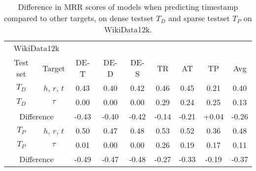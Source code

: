 \begin{table}[htb]
\centering
\begin{minipage}{\columnwidthcaption}
\centering
\caption{Difference in MRR scores of models when predicting timestamp compared to other targets, on dense testset $T_D$ and sparse testset $T_P$ on WikiData12k.}
\label{tab:time_density_timestamp_wikidata}
\end{minipage}
\vspace{-3mm}

\begin{tabular}{cc|cccccc|c} \hline
\multicolumn{2}{c|}{WikiData12k} & & & & & & \\
Test set & Target & DE-T & DE-D & DE-S & TR & AT & TP & Avg \\ \hline 
$T_D$ & $h$, $r$, $t$ & 
0.43 & 0.40 & 0.42 & 0.46 & 0.45 & 0.21 & 0.40 \\
$T_D$ & $\tau$        & 
0.00 & 0.00 & 0.00 & 0.29 & 0.24 & 0.25 & 0.13\\ \hline
\multicolumn{2}{c|}{Difference} & 
-0.43 & -0.40 & -0.42 & -0.14 & -0.21 & +0.04 & -0.26 \\ \hline\hline
$T_P$ & $h$, $r$, $t$ & 
0.50 & 0.47 & 0.48 & 0.53 & 0.52 & 0.36 & 0.48 \\
$T_P$ & $\tau$        & 
0.01 & 0.00 & 0.00 & 0.26 & 0.19 & 0.17 & 0.11\\ \hline 
\multicolumn{2}{c|}{Difference} & 
-0.49 & -0.47 & -0.48 & -0.27 & -0.33 & -0.19 & -0.37 \\ \hline
\end{tabular}

\end{table}

